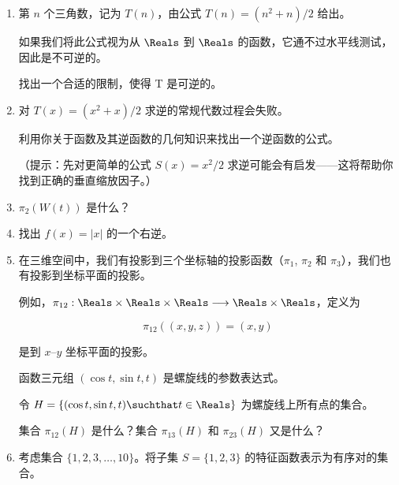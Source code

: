 \begin{enumerate}

    \item 第 $n$ 个三角数，记为 $T(n)$，由公式 $T(n) = (n^2 + n)/2$ 给出。
    
    如果我们将此公式视为从 $\Reals$ 到 $\Reals$ 的函数，它通不过水平线测试，因此是不可逆的。
    
    找出一个合适的限制，使得 T 是可逆的。
    
    \wbvfill
    
    \item 对 $T(x) = (x^2+x)/2$ 求逆的常规代数过程会失败。
    
    利用你关于函数及其逆函数的几何知识来找出一个逆函数的公式。
    
   
    （提示：先对更简单的公式 $S(x) = x^2/2$ 求逆可能会有启发——这将帮助你找到正确的垂直缩放因子。）
    
    \wbvfill
    
    \item $\pi_2(W(t))$ 是什么？
    
    \wbvfill
    
    \item 找出 $f(x) = |x|$ 的一个右逆。
    
    \wbvfill
    
    \workbookpagebreak
    
    \item 在三维空间中，我们有投影到三个坐标轴的投影函数（$\pi_1$, $\pi_2$ 和 $\pi_3$），我们也有投影到坐标平面的投影。
    
    例如，$\pi_{12}: \Reals \times \Reals \times \Reals \longrightarrow \Reals \times \Reals$，定义为
    
    \[ \pi_{12}((x,y,z)) = (x,y) \]
        
    \noindent 是到 $x$--$y$ 坐标平面的投影。
    
    函数三元组 $(\cos{t}, \sin{t}, t)$ 是螺旋线的参数表达式。
    
    令 $H = \{ (\cos{t}, \sin{t}, t) \suchthat t \in \Reals \}$ 为螺旋线上所有点的集合。
    
    集合 $\pi_{12}(H)$ 是什么？集合 $\pi_{13}(H)$ 和 $\pi_{23}(H)$ 又是什么？
    
    \wbvfill
    
    \workbookpagebreak
    
    \item 考虑集合 $\{1, 2, 3, \ldots, 10\}$。将子集 $S = \{1, 2, 3 \}$ 的特征函数表示为有序对的集合。
    

\end{enumerate}
